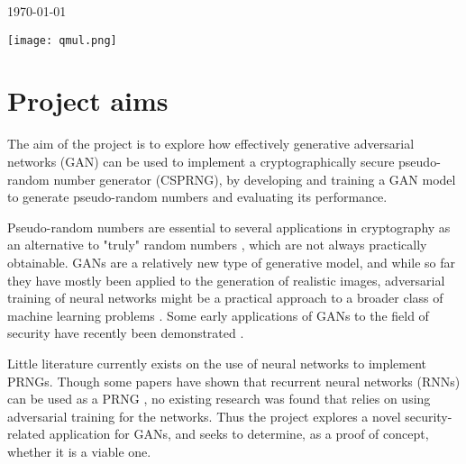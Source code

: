 \documentclass[12pt, titlepage]{article}
\begin{document}
\begin{titlepage}

	\vfill\vfill\vfill %

	{\large\today} %


	\vfill\vfill
	\texttt{[image: qmul.png]}\\[1cm] %


	\vfill %

\end{titlepage}

\tableofcontents
\clearpage


\section{Project aims}
The aim of the project is to explore how effectively generative adversarial
networks (GAN) can be used to implement a cryptographically secure pseudo-random
number generator (CSPRNG), by developing and training a GAN model to generate
pseudo-random numbers and evaluating its performance.

Pseudo-random numbers are essential to several applications in cryptography
as an alternative to "truly" random numbers \cite{ferguson2011cryptography}, which are not always practically
obtainable. GANs are a relatively new type of generative model, and while so far
they have mostly been applied to the generation of realistic images, adversarial
training of neural networks might be a practical approach to a broader class of
machine learning problems \cite{goodfellow2014generative}\cite{goodfellow2016nips}.
Some early applications of GANs to the field of security have recently
been demonstrated \cite{abadi2016learning}.

Little literature currently exists on the use of neural networks to implement
PRNGs. Though some papers have shown that recurrent neural networks (RNNs) can
be used as a PRNG \cite{tirdad2010hopfield}\cite{desai2011pseudo}, no existing research was found that relies on using
adversarial training for the networks. Thus the project explores a novel
security-related application for GANs, and seeks to determine, as a proof of
concept, whether it is a viable one.
\end{document}
